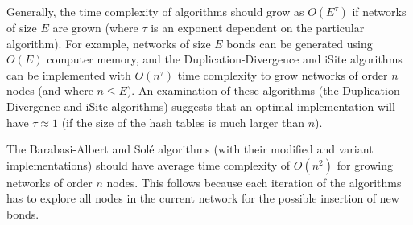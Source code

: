 \documentclass[12pt]{iopart}
\begin{document}
Generally, the time complexity of algorithms should grow
as $O(E^\tau)$ if networks of size $E$ are grown (where $\tau$ is an exponent
dependent on the particular algorithm).   For example, networks of size $E$ 
bonds can be generated using $O(E)$ computer memory, and the 
Duplication-Divergence and iSite algorithms can be implemented with
$O(n^\tau)$ time complexity to grow networks of order $n$ nodes (and where
$n\leq E$).  An examination of these algorithms (the Duplication-Divergence
and iSite algorithms) suggests that an optimal implementation will have
$\tau\approx 1$ (if the size of the hash tables is much larger than $n$).  

The Barabasi-Albert and Sol\'e algorithms (with their modified and variant 
implementations) should have average time complexity of $O(n^2)$ for
growing networks of order $n$ nodes.  This follows because each iteration of the
algorithms has to explore all nodes in the current network for the possible
insertion of new bonds.
\end{document}
